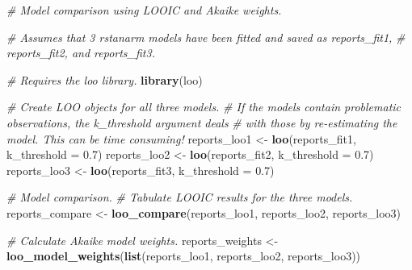 \documentclass[doc]{apa6}
\newenvironment{Shaded}{\begin{snugshade}}{\end{snugshade}}
\newcommand{\KeywordTok}[1]{\textcolor[rgb]{0.13,0.29,0.53}{\textbf{#1}}}
\newcommand{\DataTypeTok}[1]{\textcolor[rgb]{0.13,0.29,0.53}{#1}}
\newcommand{\FloatTok}[1]{\textcolor[rgb]{0.00,0.00,0.81}{#1}}
\newcommand{\StringTok}[1]{\textcolor[rgb]{0.31,0.60,0.02}{#1}}
\newcommand{\CommentTok}[1]{\textcolor[rgb]{0.56,0.35,0.01}{\textit{#1}}}
\newcommand{\NormalTok}[1]{#1}
\begin{document}
\begin{Shaded}
\begin{Highlighting}[]
\CommentTok{# Model comparison using LOOIC and Akaike weights.}

\CommentTok{# Assumes that 3 rstanarm models have been fitted and saved as reports_fit1,}
\CommentTok{# reports_fit2, and reports_fit3.}

\CommentTok{# Requires the loo library.}
\KeywordTok{library}\NormalTok{(loo)}

\CommentTok{# Create LOO objects for all three models.}
\CommentTok{# If the models contain problematic observations, the k_threshold argument deals}
\CommentTok{# with those by re-estimating the model. This can be time consuming!}
\NormalTok{reports_loo1 <-}\StringTok{ }\KeywordTok{loo}\NormalTok{(reports_fit1, }\DataTypeTok{k_threshold =} \FloatTok{0.7}\NormalTok{)}
\NormalTok{reports_loo2 <-}\StringTok{ }\KeywordTok{loo}\NormalTok{(reports_fit2, }\DataTypeTok{k_threshold =} \FloatTok{0.7}\NormalTok{)}
\NormalTok{reports_loo3 <-}\StringTok{ }\KeywordTok{loo}\NormalTok{(reports_fit3, }\DataTypeTok{k_threshold =} \FloatTok{0.7}\NormalTok{)}

\CommentTok{# Model comparison.}
\CommentTok{# Tabulate LOOIC results for the three models.}
\NormalTok{reports_compare <-}\StringTok{ }\KeywordTok{loo_compare}\NormalTok{(reports_loo1, reports_loo2, reports_loo3)}

\CommentTok{# Calculate Akaike model weights.}
\NormalTok{reports_weights <-}\StringTok{ }\KeywordTok{loo_model_weights}\NormalTok{(}\KeywordTok{list}\NormalTok{(reports_loo1, reports_loo2, reports_loo3))}
\end{Highlighting}
\end{Shaded}

\begin{table}

\caption{\label{tab:modelcomparison1}Three models arranged in descending order of predictive accuracy according to the approximate leave-one-out cross-validation information criterion (LOOIC).}
\centering
{}
\end{table}
\end{document}
